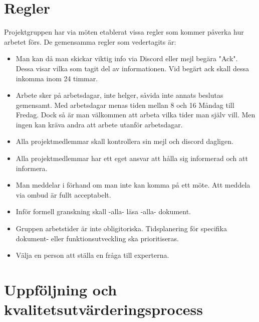 \documentclass[paper=a4, fontsize=11pt,twoside]{article}
\begin{document}
\section{Regler}
Projektgruppen har via möten etablerat vissa regler som kommer påverka hur arbetet förs.
De gemensamma regler som vedertagits är: {\color{red}{vedertagits: stavning?}}
\begin{itemize}
\item Man kan då man skickar viktig info via Discord eller mejl begära "Ack". Dessa visar vilka som tagit del av informationen. Vid begärt 		  ack skall dessa inkomma inom 24 timmar.	
\item Arbete sker på arbetsdagar, inte helger, såvida inte annats beslutas gemensamt. Med arbetsdagar menas tiden mellan 8 och 16 Måndag till Fredag. Dock så är man välkommen att arbeta vilka tider man själv vill. Men ingen kan kräva andra att arbete utanför arbetsdagar.
\item Alla projektmedlemmar skall kontrollera sin mejl och discord dagligen. 
\item Alla projektmedlemmar har ett eget ansvar att hålla sig informerad och att informera.
\item Man meddelar i förhand om man inte kan komma på ett möte. Att meddela via ombud är fullt acceptabelt.
\item Inför formell granskning skall -alla- läsa -alla- dokument. %
\item Gruppen arbetstider är inte obligitoriska. Tidsplanering för specifika
dokument- eller funktionsutveckling ska prioritiseras.
\item Välja en person att ställa en fråga till experterna. 
\end{itemize}

\section{Uppföljning och kvalitetsutvärderingsprocess}
\end{document}
